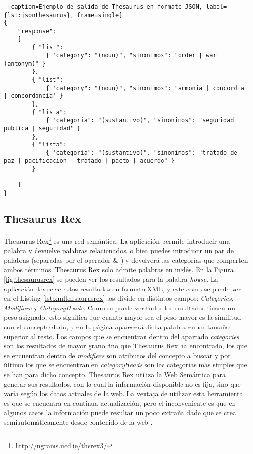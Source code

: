 
\begin{lstlisting} [caption=Ejemplo de salida de Thesaurus en formato JSON, label={lst:jsonthesaurus}, frame=single]
{
	"response":
	[
		{ "list": 
			{ "category": "(noun)", "sinonimos": "order | war (antonym)" }
		},
		{ "list": 
			{ "category": "(noun)", "sinonimos": "armonia | concordia | concordancia" }
		},
		{ "lista": 
			{ "categoria": "(sustantivo)", "sinonimos": "seguridad publica | seguridad" }
		},
		{ "lista": 
			{ "categoria": "(sustantivo)", "sinonimos": "tratado de paz | pacificacion | tratado | pacto | acuerdo" }
		}
	
	]
}
\end{lstlisting}




\subsection{Thesaurus Rex}
\label{cap:subsec:thesaurusrex}

Thesaurus Rex\footnote{http://ngrams.ucd.ie/therex3/} es una red semántica. La aplicación permite introducir una palabra y devuelve palabras relacionados, o bien puedes introducir un par de palabras (separadas por el operador  \& ) y devolverá las categorías que comparten ambos términos.
Thesaurus Rex solo admite palabras en inglés. En la Figura \ref{fig:thesaurusrex} se pueden ver los resultados para la palabra  \textit{house}.
La aplicación devuelve estos resultados en formato XML, y este como se puede ver en el Listing \ref{lst:xmlthesaurusrex} los divide en distintos campos: \textit{Categories}, \textit{Modifiers} y \textit{CategoryHeads}. Como se puede ver todos los resultados tienen un peso asignado, esto significa que cuanto mayor sea el peso mayor es la similitud con el concepto dado, y en la página aparecerá dicha palabra en un tamaño superior al resto.
Los campos que se encuentran dentro del apartado \textit{categories} son los resultados de mayor grano fino que Thesaurus Rex ha encontrado, los que se encuentran dentro de  \textit{modifiers} son atributos del concepto a buscar y por último los que se encuentran en \textit{categoryHeads} son las categorías más simples que se han para dicho concepto.
Thesaurus Rex utiliza la Web Semántica para generar sus resultados, con lo cual la información disponible no es fija, sino que varía según los datos actuales de la web.
La ventaja de utilizar esta herramienta es que se encuentra en continua actualización, pero el inconveniente es que en algunos casos la información puede resultar un poco extraña dado que se crea semiautomáticamente desde contenido de la web \citep{TFMPaloma}.

